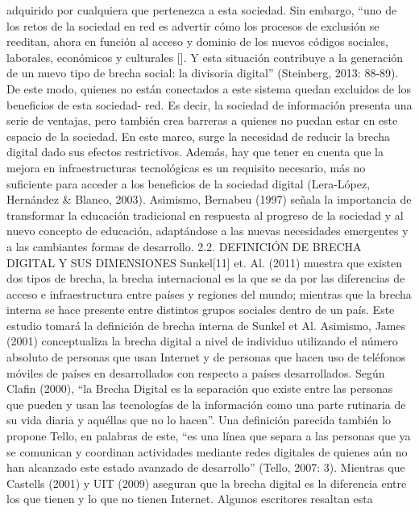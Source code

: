 \begin{enumerate}
  adquirido por cualquiera que pertenezca a esta sociedad. Sin embargo,
  ``uno de los retos de la sociedad en red es advertir cómo los procesos
  de exclusión se reeditan, ahora en función al acceso y dominio de los
  nuevos códigos sociales, laborales, económicos y culturales {[}{]}. Y
  esta situación contribuye a la generación de un nuevo tipo de brecha
  social: la divisoria digital'' (Steinberg, 2013: 88-89). De este modo,
  quienes no están conectados a este sistema quedan excluidos de los
  beneficios de esta sociedad- red. Es decir, la sociedad de información
  presenta una serie de ventajas, pero también crea barreras a quienes
  no puedan estar en este espacio de la sociedad. En este marco, surge
  la necesidad de reducir la brecha digital dado sus efectos
  restrictivos. Además, hay que tener en cuenta que la mejora en
  infraestructuras tecnológicas es un requisito necesario, más no
  suficiente para acceder a los beneficios de la sociedad digital
  (Lera-López, Hernández \& Blanco, 2003). Asimismo, Bernabeu (1997)
  señala la importancia de transformar la educación tradicional en
  respuesta al progreso de la sociedad y al nuevo concepto de educación,
  adaptándose a las nuevas necesidades emergentes y a las cambiantes
  formas de desarrollo. 2.2. DEFINICIÓN DE BRECHA DIGITAL Y SUS
  DIMENSIONES Sunkel{[}11{]} et. Al. (2011) muestra que existen dos
  tipos de brecha, la brecha internacional es la que se da por las
  diferencias de acceso e infraestructura entre países y regiones del
  mundo; mientras que la brecha interna se hace presente entre distintos
  grupos sociales dentro de un país. Este estudio tomará la definición
  de brecha interna de Sunkel et Al. Asimismo, James (2001)
  conceptualiza la brecha digital a nivel de individuo utilizando el
  número absoluto de personas que usan Internet y de personas que hacen
  uso de teléfonos móviles de países en desarrollados con respecto a
  países desarrollados. Según Clafin (2000), ``la Brecha Digital es la
  separación que existe entre las personas que pueden y usan las
  tecnologías de la información como una parte rutinaria de su vida
  diaria y aquéllas que no lo hacen''. Una definición parecida también
  lo propone Tello, en palabras de este, ``es una línea que separa a las
  personas que ya se comunican y coordinan actividades mediante redes
  digitales de quienes aún no han alcanzado este estado avanzado de
  desarrollo'' (Tello, 2007: 3). Mientras que Castells (2001) y UIT
  (2009) aseguran que la brecha digital es la diferencia entre los que
  tienen y lo que no tienen Internet. Algunos escritores resaltan esta

\end{enumerate}
